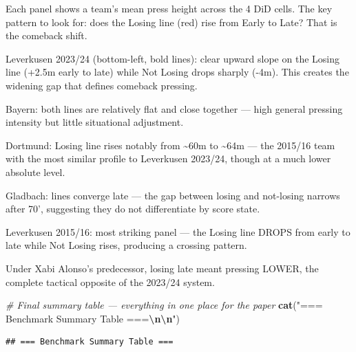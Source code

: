 \documentclass[
]{article}
\newenvironment{Shaded}{\begin{snugshade}}{\end{snugshade}}
\newcommand{\CommentTok}[1]{\textcolor[rgb]{0.56,0.35,0.01}{\textit{#1}}}
\newcommand{\FunctionTok}[1]{\textcolor[rgb]{0.13,0.29,0.53}{\textbf{#1}}}
\newcommand{\NormalTok}[1]{#1}
\newcommand{\SpecialCharTok}[1]{\textcolor[rgb]{0.81,0.36,0.00}{\textbf{#1}}}
\newcommand{\StringTok}[1]{\textcolor[rgb]{0.31,0.60,0.02}{#1}}
\begin{document}
Each panel shows a team's mean press height across the 4 DiD cells. The
key pattern to look for: does the Losing line (red) rise from Early to
Late? That is the comeback shift.

Leverkusen 2023/24 (bottom-left, bold lines): clear upward slope on the
Losing line (+2.5m early to late) while Not Losing drops sharply (-4m).
This creates the widening gap that defines comeback pressing.

Bayern: both lines are relatively flat and close together --- high
general pressing intensity but little situational adjustment.

Dortmund: Losing line rises notably from \textasciitilde60m to
\textasciitilde64m --- the 2015/16 team with the most similar profile to
Leverkusen 2023/24, though at a much lower absolute level.

Gladbach: lines converge late --- the gap between losing and not-losing
narrows after 70', suggesting they do not differentiate by score state.

Leverkusen 2015/16: most striking panel --- the Losing line DROPS from
early to late while Not Losing rises, producing a crossing pattern.

Under Xabi Alonso's predecessor, losing late meant pressing LOWER, the
complete tactical opposite of the 2023/24 system.

\begin{Shaded}
\begin{Highlighting}[]
\CommentTok{\# Final summary table — everything in one place for the paper}
\FunctionTok{cat}\NormalTok{(}\StringTok{"=== Benchmark Summary Table ===}\SpecialCharTok{\textbackslash{}n\textbackslash{}n}\StringTok{"}\NormalTok{)}
\end{Highlighting}
\end{Shaded}

\begin{verbatim}
## === Benchmark Summary Table ===
\end{verbatim}
\end{document}

